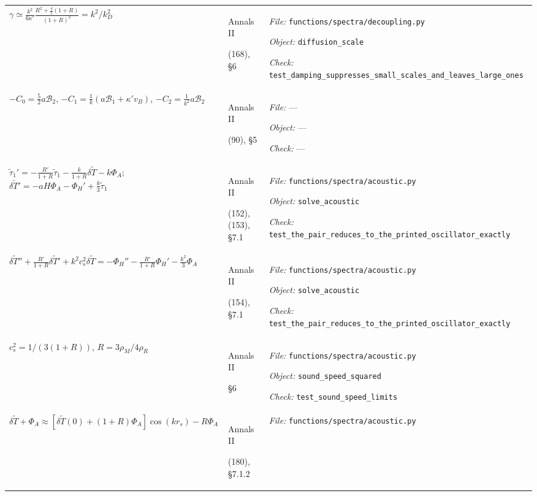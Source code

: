 \begin{landscape}
\begin{longtable}{@{}>{\raggedright\arraybackslash}p{80mm}
                     >{\raggedright\arraybackslash}p{38mm}
                     >{\raggedright\arraybackslash}p{99mm}@{}}
\addlinespace[2pt]
$\gamma\simeq\frac{k^2}{6\kappa'}\frac{R^2+\frac45(1+R)}{(1+R)^2}=k^2/k_D^2$ & Annals II\par (168), \S6 & {\scriptsize \textit{File:} \nolinkurl{functions/spectra/decoupling.py}\par
\textit{Object:} \nolinkurl{diffusion_scale}\par
\textit{Check:} \nolinkurl{test_damping_suppresses_small_scales_and_leaves_large_ones}} \\
\addlinespace[2pt]
$-C_0=\tfrac52 a\mathcal B_2$, $-C_1=\tfrac1k(a\mathcal B_1+\kappa' v_B)$, $-C_2=\tfrac1{k^2}a\mathcal B_2$ & Annals II\par (90), \S5 & {\scriptsize \textit{File:} ---\par
\textit{Object:} ---\par
\textit{Check:} ---} \\
\addlinespace[2pt]
$\tilde\tau_1' = -\frac{R'}{1+R}\tilde\tau_1 - \frac{k}{1+R}\delta\tilde T - k\Phi_A$; $\delta\tilde T' = -aH\Phi_A - \Phi_H' + \frac k3\tilde\tau_1$ & Annals II\par (152), (153), \S7.1 & {\scriptsize \textit{File:} \nolinkurl{functions/spectra/acoustic.py}\par
\textit{Object:} \nolinkurl{solve_acoustic}\par
\textit{Check:} \nolinkurl{test_the_pair_reduces_to_the_printed_oscillator_exactly}} \\
\addlinespace[2pt]
$\delta\tilde T'' + \frac{R'}{1+R}\delta\tilde T' + k^2c_s^2\delta\tilde T = -\Phi_H'' - \frac{R'}{1+R}\Phi_H' - \frac{k^2}{3}\Phi_A$ & Annals II\par (154), \S7.1 & {\scriptsize \textit{File:} \nolinkurl{functions/spectra/acoustic.py}\par
\textit{Object:} \nolinkurl{solve_acoustic}\par
\textit{Check:} \nolinkurl{test_the_pair_reduces_to_the_printed_oscillator_exactly}} \\
\addlinespace[2pt]
$c_s^2 = 1/(3(1+R))$, $R=3\rho_M/4\rho_R$ & Annals II\par \S6 & {\scriptsize \textit{File:} \nolinkurl{functions/spectra/acoustic.py}\par
\textit{Object:} \nolinkurl{sound_speed_squared}\par
\textit{Check:} \nolinkurl{test_sound_speed_limits}} \\
\addlinespace[2pt]
$\delta\tilde T+\Phi_A \approx [\delta\tilde T(0)+(1+R)\Phi_A]\cos(kr_s) - R\Phi_A$ & Annals II\par (180), \S7.1.2 & {\scriptsize \textit{File:} \nolinkurl{functions/spectra/acoustic.py}\par
}
\end{longtable}
\end{landscape}
